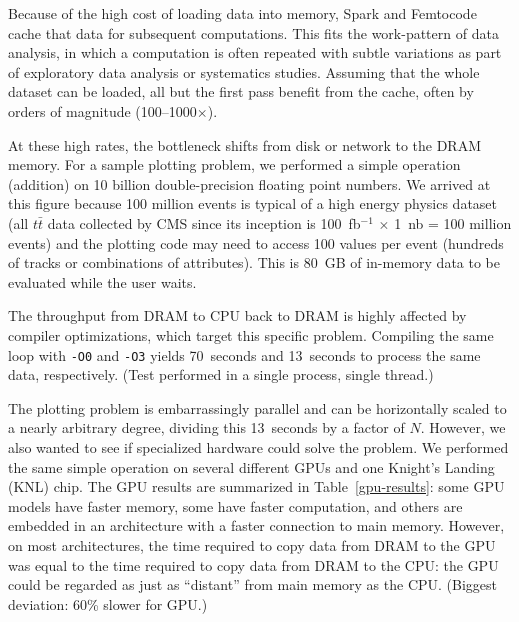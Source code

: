 \documentclass[12pt]{article}
\begin{document}
Because of the high cost of loading data into memory, Spark and Femtocode cache that data for subsequent computations. This fits the work-pattern of data analysis, in which a computation is often repeated with subtle variations as part of exploratory data analysis or systematics studies. Assuming that the whole dataset can be loaded, all but the first pass benefit from the cache, often by orders of magnitude (100--1000$\times$).

At these high rates, the bottleneck shifts from disk or network to the DRAM memory. For a sample plotting problem, we performed a simple operation (addition) on 10 billion double-precision floating point numbers. We arrived at this figure because 100 million events is typical of a high energy physics dataset (all $t\bar{t}$ data collected by CMS since its inception is 100~fb$^{-1}$ $\times$ 1~nb = 100 million events) and the plotting code may need to access 100 values per event (hundreds of tracks or combinations of attributes). This is 80~GB of in-memory data to be evaluated while the user waits.

The throughput from DRAM to CPU back to DRAM is highly affected by compiler optimizations, which target this specific problem. Compiling the same loop with {\tt -O0} and {\tt -O3} yields 70~seconds and 13~seconds to process the same data, respectively. (Test performed in a single process, single thread.)

The plotting problem is embarrassingly parallel and can be horizontally scaled to a nearly arbitrary degree, dividing this 13~seconds by a factor of $N$. However, we also wanted to see if specialized hardware could solve the problem. We performed the same simple operation on several different GPUs and one Knight's Landing (KNL) chip. The GPU results are summarized in Table~\ref{gpu-results}: some GPU models have faster memory, some have faster computation, and others are embedded in an architecture with a faster connection to main memory. However, on most architectures, the time required to copy data from DRAM to the GPU was equal to the time required to copy data from DRAM to the CPU: the GPU could be regarded as just as ``distant'' from main memory as the CPU. (Biggest deviation: 60\% slower for GPU.)
\end{document}
